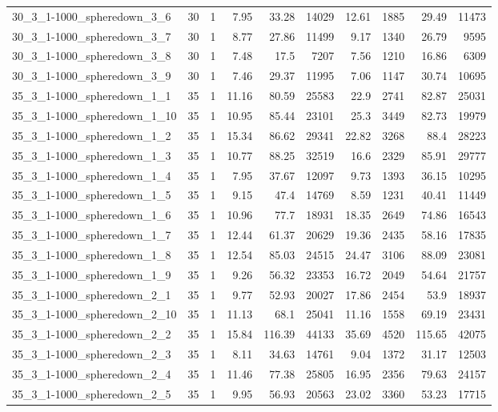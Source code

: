 \begin{center}
\begin{scriptsize}
\begin{longtable}{lrrrrrrrrr}
30\_3\_1-1000\_spheredown\_3\_6 & 30 & 1 & 7.95 & 33.28 & 14029 & 12.61 & 1885 & 29.49 & 11473\\
30\_3\_1-1000\_spheredown\_3\_7 & 30 & 1 & 8.77 & 27.86 & 11499 & 9.17 & 1340 & 26.79 & 9595\\
30\_3\_1-1000\_spheredown\_3\_8 & 30 & 1 & 7.48 & 17.5 & 7207 & 7.56 & 1210 & 16.86 & 6309\\
30\_3\_1-1000\_spheredown\_3\_9 & 30 & 1 & 7.46 & 29.37 & 11995 & 7.06 & 1147 & 30.74 & 10695\\
35\_3\_1-1000\_spheredown\_1\_1 & 35 & 1 & 11.16 & 80.59 & 25583 & 22.9 & 2741 & 82.87 & 25031\\
35\_3\_1-1000\_spheredown\_1\_10 & 35 & 1 & 10.95 & 85.44 & 23101 & 25.3 & 3449 & 82.73 & 19979\\
35\_3\_1-1000\_spheredown\_1\_2 & 35 & 1 & 15.34 & 86.62 & 29341 & 22.82 & 3268 & 88.4 & 28223\\
35\_3\_1-1000\_spheredown\_1\_3 & 35 & 1 & 10.77 & 88.25 & 32519 & 16.6 & 2329 & 85.91 & 29777\\
35\_3\_1-1000\_spheredown\_1\_4 & 35 & 1 & 7.95 & 37.67 & 12097 & 9.73 & 1393 & 36.15 & 10295\\
35\_3\_1-1000\_spheredown\_1\_5 & 35 & 1 & 9.15 & 47.4 & 14769 & 8.59 & 1231 & 40.41 & 11449\\
35\_3\_1-1000\_spheredown\_1\_6 & 35 & 1 & 10.96 & 77.7 & 18931 & 18.35 & 2649 & 74.86 & 16543\\
35\_3\_1-1000\_spheredown\_1\_7 & 35 & 1 & 12.44 & 61.37 & 20629 & 19.36 & 2435 & 58.16 & 17835\\
35\_3\_1-1000\_spheredown\_1\_8 & 35 & 1 & 12.54 & 85.03 & 24515 & 24.47 & 3106 & 88.09 & 23081\\
35\_3\_1-1000\_spheredown\_1\_9 & 35 & 1 & 9.26 & 56.32 & 23353 & 16.72 & 2049 & 54.64 & 21757\\
35\_3\_1-1000\_spheredown\_2\_1 & 35 & 1 & 9.77 & 52.93 & 20027 & 17.86 & 2454 & 53.9 & 18937\\
35\_3\_1-1000\_spheredown\_2\_10 & 35 & 1 & 11.13 & 68.1 & 25041 & 11.16 & 1558 & 69.19 & 23431\\
35\_3\_1-1000\_spheredown\_2\_2 & 35 & 1 & 15.84 & 116.39 & 44133 & 35.69 & 4520 & 115.65 & 42075\\
35\_3\_1-1000\_spheredown\_2\_3 & 35 & 1 & 8.11 & 34.63 & 14761 & 9.04 & 1372 & 31.17 & 12503\\
35\_3\_1-1000\_spheredown\_2\_4 & 35 & 1 & 11.46 & 77.38 & 25805 & 16.95 & 2356 & 79.63 & 24157\\
35\_3\_1-1000\_spheredown\_2\_5 & 35 & 1 & 9.95 & 56.93 & 20563 & 23.02 & 3360 & 53.23 & 17715\\

\end{longtable}
\end{scriptsize}
\end{center}
